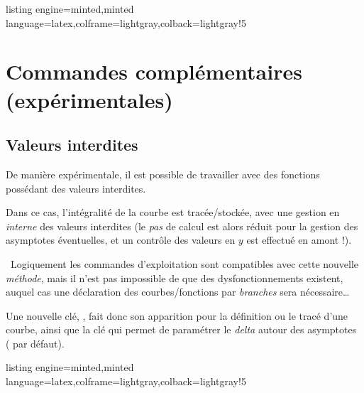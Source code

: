 \documentclass[11pt,a4paper]{ltxdoc}
\begin{document}
\begin{tcblisting}{listing engine=minted,minted language=latex,colframe=lightgray,colback=lightgray!5}
\begin{GraphiqueTikz}[Xmin=-4,Xmax=4,Ymin=-4,Ymax=4,Rmax=4,]
\end{GraphiqueTikz}
\end{tcblisting}

\pagebreak

\section{Commandes complémentaires (expérimentales)}

\subsection{Valeurs interdites}\label{valinterdites}

De manière expérimentale, il est possible de travailler avec des fonctions possédant des valeurs interdites.

Dans ce cas, l'intégralité de la courbe est tracée/stockée, avec une gestion en \textit{interne} des valeurs interdites (le \textit{pas} de calcul est alors réduit pour la gestion des asymptotes éventuelles, et un contrôle des valeurs en $y$ est effectué en amont !).

\smallskip

{\footnotesize\faBomb}~Logiquement les commandes d'exploitation sont compatibles avec cette nouvelle \textit{méthode}, mais il n'est pas impossible de que des dysfonctionnements existent, auquel cas une déclaration des courbes/fonctions par \textit{branches} sera nécessaire\ldots

\smallskip

Une nouvelle clé, \MontreCode{[ValeursInterdites={...}]}, fait donc son apparition pour la définition ou le tracé d'une courbe, ainsi que la clé \MontreCode{[DeltaVI=...]} qui permet de paramétrer le \textit{delta} autour des asymptotes ( par défaut).

\begin{tcblisting}{listing engine=minted,minted language=latex,colframe=lightgray,colback=lightgray!5}
\begin{GraphiqueTikz}[x=0.75cm,y=0.75cm,Xmin=-5,Xmax=5,Ymin=-5,Ymax=5]
\end{GraphiqueTikz}
\end{tcblisting}
\end{document}
